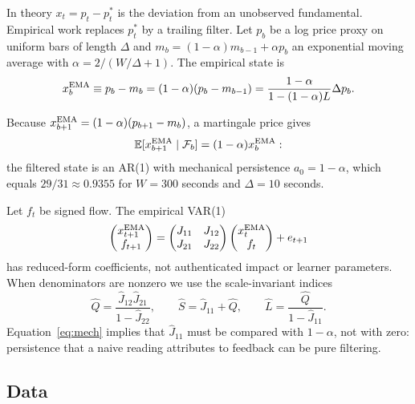 \documentclass[12pt]{article}
\theoremstyle{definition}
\theoremstyle{remark}
\newcommand{\E}{\mathbb{E}}
\begin{document}
In theory $x_t=p_t-p^*_t$ is the deviation from an unobserved fundamental. Empirical work replaces $p^*_t$ by a trailing filter. Let $p_b$ be a log price proxy on uniform bars of length $\Delta$ and $m_b=(1-\alpha)m_{b-1}+\alpha p_b$ an exponential moving average with $\alpha=2/(W/\Delta+1)$. The empirical state is
\begin{equation}\label{eq:ema}
x^{\rm EMA}_b\equiv p_b-m_b=(1-\alpha)(p_b-m_{b-1})=\frac{1-\alpha}{1-(1-\alpha)L}\Delta p_b .
\end{equation}

Because $x^{\rm EMA}_{b+1}=(1-\alpha)(p_{b+1}-m_b)$, a martingale price gives
\begin{equation}\label{eq:mech}
\E[x^{\rm EMA}_{b+1}\mid\mathcal F_b]=(1-\alpha)x^{\rm EMA}_b :
\end{equation}
the filtered state is an AR(1) with mechanical persistence $a_0=1-\alpha$, which equals $29/31\approx0.9355$ for $W=300$ seconds and $\Delta=10$ seconds.

Let $f_t$ be signed flow. The empirical VAR(1)
\begin{equation}\label{eq:var}
\begin{pmatrix}x^{\rm EMA}_{t+1}\\ f_{t+1}\end{pmatrix}=\begin{pmatrix}J_{11}&J_{12}\\ J_{21}&J_{22}\end{pmatrix}\begin{pmatrix}x^{\rm EMA}_t\\ f_t\end{pmatrix}+e_{t+1}
\end{equation}
has reduced-form coefficients, not authenticated impact or learner parameters. When denominators are nonzero we use the scale-invariant indices
\begin{equation}\label{eq:QS}
\hat Q=\frac{\hat J_{12}\hat J_{21}}{1-\hat J_{22}},\qquad\hat S=\hat J_{11}+\hat Q,\qquad\hat L=\frac{\hat Q}{1-\hat J_{11}} .
\end{equation}
Equation~\eqref{eq:mech} implies that $\hat J_{11}$ must be compared with $1-\alpha$, not with zero: persistence that a naive reading attributes to feedback can be pure filtering.

\subsection{Data}
\end{document}
